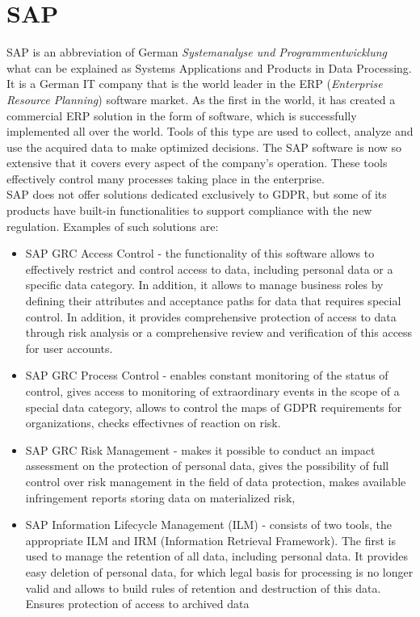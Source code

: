 \documentclass[en, noamssymb]{mgr}
\begin{document}
\section{SAP}

SAP is an abbreviation of German \textit{Systemanalyse und Programmentwicklung} what can be explained as Systems Applications and Products in Data Processing. It is a German IT company that is the world leader in the ERP (\textit{Enterprise Resource Planning}) software market. As the first in the world, it has created a commercial ERP solution in the form of software, which is successfully implemented all over the world. Tools of this type are used to collect, analyze and use the acquired data to make optimized decisions. The SAP software is now so extensive that it covers every aspect of the company's operation. These tools effectively control many processes taking place in the enterprise.\\
\indent SAP does not offer solutions dedicated exclusively to GDPR, but some of its products have built-in functionalities to support compliance with the new regulation.
Examples of such solutions are:

\begin{itemize}

\item SAP GRC Access Control - the functionality of this software allows to effectively restrict and control access to data, including personal data or a specific data category. In addition, it allows to manage business roles by defining their attributes and acceptance paths for data that requires special control. In addition, it provides comprehensive protection of access to data through risk analysis or a comprehensive review and verification of this access for user accounts.

\item SAP GRC Process Control - enables constant monitoring of the status of control, gives access to monitoring of extraordinary events in the scope of a special data category, allows to control the maps of GDPR requirements for organizations, checks  effectivnes of reaction on risk.

\item SAP GRC Risk Management - makes it possible to conduct an impact assessment on the protection of personal data, gives the possibility of full control over risk management in the field of data protection, makes available infringement reports storing data on materialized risk,

\item SAP Information Lifecycle Management (ILM) - consists of two tools, the appropriate ILM and IRM (Information Retrieval Framework). The first is used to manage the retention of all data, including personal data. It provides easy deletion of personal data, for which legal basis for processing is no longer valid and allows to build rules of retention and destruction of this data. Ensures protection of access to archived data

\end{itemize}
\end{document}
